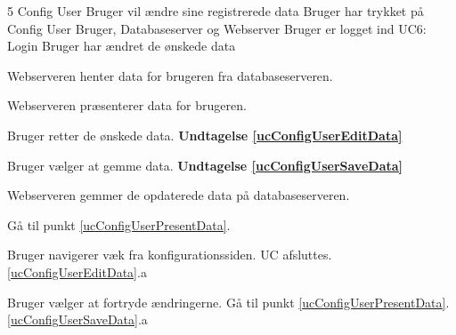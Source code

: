 \uchead
	{5} %
	{Config User} %
	{Bruger vil ændre sine registrerede data} %
	{Bruger har trykket på Config User} %
	{Bruger, Databaseserver og Webserver} %
	{Bruger er logget ind} %
	{UC6: Login} %
	{} %
	{Bruger har ændret de ønskede data} %


\item\label{ucConfigUserPresentData} Webserveren henter data for brugeren fra databaseserveren.

\item Webserveren præsenterer data for brugeren.

\item\label{ucConfigUserEditData} Bruger retter de ønskede data. \textbf{Undtagelse \ref{ucConfigUserEditData}}

\item\label{ucConfigUserSaveData} Bruger vælger at gemme data. \textbf{Undtagelse \ref{ucConfigUserSaveData}}

\item Webserveren gemmer de opdaterede data på databaseserveren.

\item Gå til punkt \ref{ucConfigUserPresentData}.


\ucdescriptionend %

\ucextension
	{Bruger navigerer væk fra konfigurationssiden.}
	{UC afsluttes.}
	{\ref{ucConfigUserEditData}.a}

\ucextension
	{Bruger vælger at fortryde ændringerne.}
	{Gå til punkt \ref{ucConfigUserPresentData}.}
	{\ref{ucConfigUserSaveData}.a}

